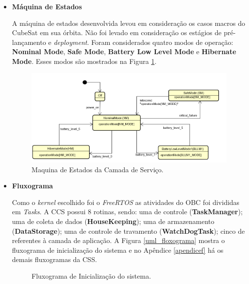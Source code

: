 \begin{itemize}

\item \textbf{Máquina de Estados}

A máquina de estados desenvolvida levou em consideração os casos macros do CubeSat em sua órbita. Não foi levado em consideração os estágios de pré-lançamento e \textit{deployment}. Foram considerados quatro modos de operação: \textbf{Nominal Mode}, \textbf{Safe Mode}, \textbf{Battery Low Level Mode} e \textbf{Hibernate Mode}. Esses modos são mostrados na Figura \ref{uml_me}.

\begin{figure}[h]
	\centering
	\caption{Maquina de Estados da Camada de Serviço.}
	
	\includegraphics[keepaspectratio=true,scale=0.62]{figuras/stateMachine.png}
	
	\label{uml_me}
\end{figure}

\item \textbf{Fluxograma}

Como o \textit{kernel} escolhido foi o \textit{FreeRTOS} as atividades do OBC foi divididas em \textit{Tasks}. A CCS possui 8 rotinas, sendo: uma de controle (\textbf{TaskManager}); uma de coleta de dados (\textbf{HouseKeeping}); uma de armazenamento (\textbf{DataStorage}); uma de controle de travamento (\textbf{WatchDogTask}); cinco de referentes à camada de aplicação. A Figura \ref{uml_floxograma} mostra o fluxograma de inicialização do sistema e no Apêndice \ref{apendicef} há os demais fluxogramas da CSS. 

\begin{figure}[h]
	\centering
	\caption{Fluxograma de Inicialização do sistema.}
	

\end{figure}
\end{itemize}

